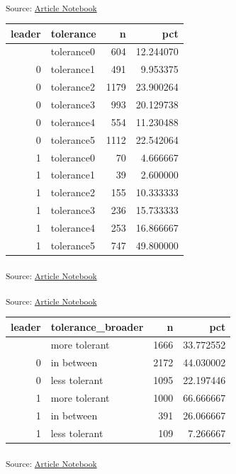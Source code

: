 \documentclass[
  letterpaper,
  DIV=11,
  numbers=noendperiod]{scrartcl}
\begin{document}
\textsubscript{Source:
\href{https://h-christy.github.io/data-ethics-final/index.qmd.html}{Article
Notebook}}

\begin{longtable}[]{@{}rlrr@{}}
\toprule\noalign{}
leader & tolerance & n & pct \\
\midrule\noalign{}
\endhead
\bottomrule\noalign{}
\endlastfoot
0 & tolerance0 & 604 & 12.244070 \\
0 & tolerance1 & 491 & 9.953375 \\
0 & tolerance2 & 1179 & 23.900264 \\
0 & tolerance3 & 993 & 20.129738 \\
0 & tolerance4 & 554 & 11.230488 \\
0 & tolerance5 & 1112 & 22.542064 \\
1 & tolerance0 & 70 & 4.666667 \\
1 & tolerance1 & 39 & 2.600000 \\
1 & tolerance2 & 155 & 10.333333 \\
1 & tolerance3 & 236 & 15.733333 \\
1 & tolerance4 & 253 & 16.866667 \\
1 & tolerance5 & 747 & 49.800000 \\
\end{longtable}

\textsubscript{Source:
\href{https://h-christy.github.io/data-ethics-final/index.qmd.html}{Article
Notebook}}

\textsubscript{Source:
\href{https://h-christy.github.io/data-ethics-final/index.qmd.html}{Article
Notebook}}

\begin{longtable}[]{@{}rlrr@{}}
\toprule\noalign{}
leader & tolerance\_broader & n & pct \\
\midrule\noalign{}
\endhead
\bottomrule\noalign{}
\endlastfoot
0 & more tolerant & 1666 & 33.772552 \\
0 & in between & 2172 & 44.030002 \\
0 & less tolerant & 1095 & 22.197446 \\
1 & more tolerant & 1000 & 66.666667 \\
1 & in between & 391 & 26.066667 \\
1 & less tolerant & 109 & 7.266667 \\
\end{longtable}

\textsubscript{Source:
\href{https://h-christy.github.io/data-ethics-final/index.qmd.html}{Article
Notebook}}
\end{document}
